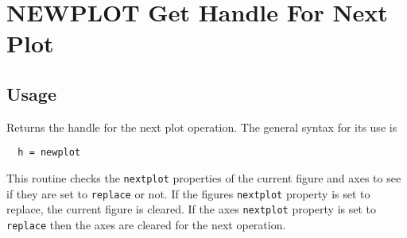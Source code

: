 \section{NEWPLOT Get Handle For Next Plot}

\subsection{Usage}

Returns the handle for the next plot operation.  The general
syntax for its use is
\begin{verbatim}
  h = newplot
\end{verbatim}
This routine checks the \verb|nextplot| properties of the current
figure and axes to see if they are set to \verb|replace| or not. If
the figures \verb|nextplot| property is set to replace, the current
figure is cleared.  If the axes \verb|nextplot| property is set to
\verb|replace| then the axes are cleared for the next operation.  

